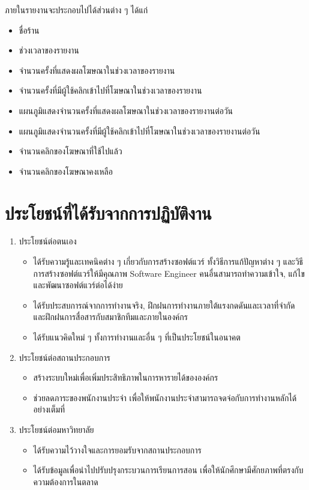 ภายในรายงานจะประกอบไปได้ส่วนต่าง ๆ ได้แก่

\begin{itemize}
	\item ชื่อร้าน
	\item ช่วงเวลาของรายงาน
	\item จำนวนครั้งที่แสดงผลโฆษณาในช่วงเวลาของรายงาน
	\item จำนวนครั้งที่มีผู้ใช้คลิกเข้าไปที่โฆษณาในช่วงเวลาของรายงาน
	\item แผนภูมิแสดงจำนวนครั้งที่แสดงผลโฆษณาในช่วงเวลาของรายงานต่อวัน
	\item แผนภูมิแสดงจำนวนครั้งที่มีผู้ใช้คลิกเข้าไปที่โฆษณาในช่วงเวลาของรายงานต่อวัน
	\item จำนวนคลิกของโฆษณาที่ใช้ไปแล้ว
	\item จำนวนคลิกของโฆษณาคงเหลือ
\end{itemize}

\section{ประโยชน์ที่ได้รับจากการปฏิบัติงาน}
\begin{enumerate}
	\item ประโยชน์ต่อตนเอง
	\begin{itemize}
		\item ได้รับความรู้และเทคนิคต่าง ๆ เกี่ยวกับการสร้างซอฟต์แวร์ ทั้งวิธีการแก้ปัญหาต่าง ๆ และวิธีการสร้างซอฟต์แวร์ให้มีคุณภาพ Software Engineer คนอื่นสามารถทำความเข้าใจ, แก้ไข และพัฒนาซอฟต์แวร์ต่อได้ง่าย	
		\item ได้รับประสบการณ์จากการทำงานจริง, ฝึกฝนการทำงานภายใต้แรงกดดันและเวลาที่จำกัด และฝึกฝนการสื่อสารกับสมาชิกทีมและภายในองค์กร
		\item ได้รับแนวคิดใหม่ ๆ ทั้งการทำงานและอื่น ๆ ที่เป็นประโยชน์ในอนาคต
	\end{itemize}
	\item ประโยชน์ต่อสถานประกอบการ
	\begin{itemize}
		\item สร้างระบบใหม่เพื่อเพิ่มประสิทธิภาพในการหารายได้ขององค์กร
		\item ช่วยลดภาระของพนักงานประจำ เพื่อให้พนักงานประจำสามารถจดจ่อกับการทำงานหลักได้อย่างเต็มที่
	\end{itemize}
	\item ประโยชน์ต่อมหาวิทยาลัย
	\begin{itemize}
		\item ได้รับความไว้วางใจและการยอมรับจากสถานประกอบการ
		\item ได้รับข้อมูลเพื่อนำไปปรับปรุงกระบวนการเรียนการสอน เพื่อให้นักศึกษามีศักยภาพที่ตรงกับความต้องการในตลาด
	\end{itemize}
\end{enumerate}

